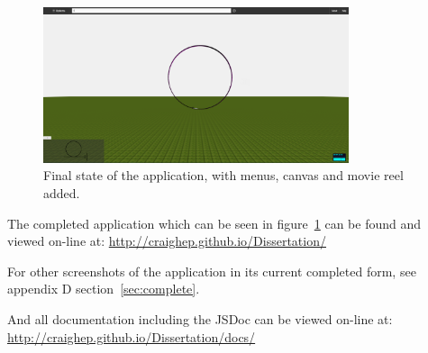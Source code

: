 \begin{figure}[h!]
	\centering
	\includegraphics[width=0.8\textwidth]{images/final.png}
	\caption{Final state of the application, with menus, canvas and movie reel added.}
	\label{fig:final}
\end{figure}

The completed application which can be seen in figure~\ref{fig:final} can be found and viewed on-line at: \url{http://craighep.github.io/Dissertation/}

For other screenshots of the application in its current completed form, see appendix D section~\ref{sec:complete}.

And all documentation including the JSDoc can be viewed on-line at: \url{http://craighep.github.io/Dissertation/docs/}